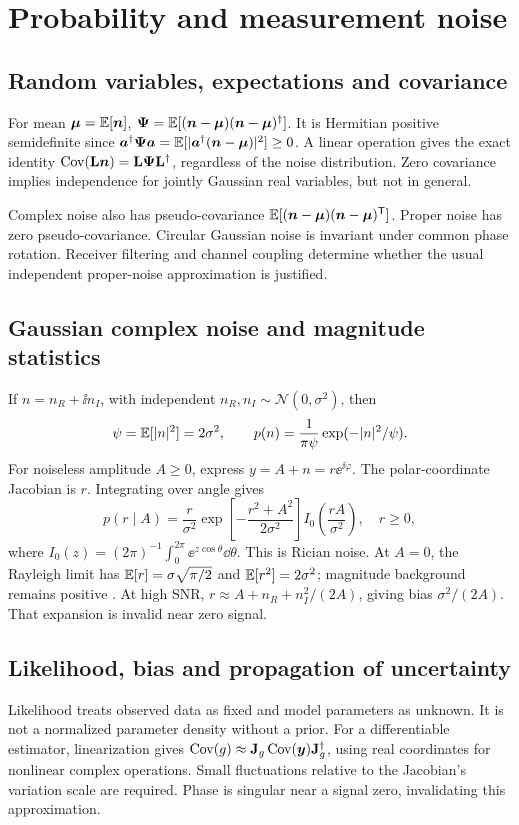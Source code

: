 \section{Probability and measurement noise}
\label{sec:01:probability-and-measurement-noise}
\subsection{Random variables, expectations and covariance}
For mean $\bm{\mu}=\operatorname{\mathbb{E}}[\bm{n}]$,
$\mathbf{\Psi}=\operatorname{\mathbb{E}}[(\bm{n}-\bm{\mu})(\bm{n}-\bm{\mu})^{\dagger}]$.
It is Hermitian positive semidefinite since
$\bm{a}^{\dagger}\mathbf{\Psi}\bm{a}=\operatorname{\mathbb{E}}[\lvert\bm{a}^{\dagger}(\bm{n}-\bm{\mu})\rvert^2]\geq0$.
A linear operation gives the exact identity
$\operatorname{Cov}(\mathbf{L}\bm{n})=\mathbf{L}\mathbf{\Psi}\mathbf{L}^{\dagger}$,
regardless of the noise distribution. Zero covariance implies independence
for jointly Gaussian real variables, but not in general.

Complex noise also has pseudo-covariance
$\operatorname{\mathbb{E}}[(\bm{n}-\bm{\mu})(\bm{n}-\bm{\mu})^{\mathsf T}]$.
Proper noise has zero pseudo-covariance.
Circular Gaussian noise is invariant under common phase rotation.
Receiver filtering and channel coupling determine whether the usual
independent proper-noise approximation is justified.

\subsection{Gaussian complex noise and magnitude statistics}
If $n=n_R+\ii n_I$, with independent
$n_R,n_I\sim\mathcal N(0,\sigma^2)$, then
\[
 \psi=\operatorname{\mathbb{E}}[\lvert n\rvert^2]=2\sigma^2,\qquad
 p(n)=\frac{1}{\pi\psi}\exp(-\lvert n\rvert^2/\psi).
\]
For noiseless amplitude $A\geq0$, express $y=A+n=r\ee^{\ii\varphi}$.
The polar-coordinate Jacobian is $r$. Integrating over angle gives
\begin{equation}
 p(r\mid A)=\frac r{\sigma^2}
   \exp\left[-\frac{r^2+A^2}{2\sigma^2}\right]
   I_0\left(\frac{rA}{\sigma^2}\right),\quad r\geq0,
 \label{eq:01:rice}
\end{equation}
where $I_0(z)=(2\pi)^{-1}\int_0^{2\pi}\ee^{z\cos\theta}\dd\theta$.
This is Rician noise. At $A=0$, the Rayleigh limit has
$\operatorname{\mathbb{E}}[r]=\sigma\sqrt{\pi/2}$ and $\operatorname{\mathbb{E}}[r^2]=2\sigma^2$;
magnitude background remains positive \cite{gudbjartsson1995}.
At high SNR,
$r\approx A+n_R+n_I^2/(2A)$, giving bias $\sigma^2/(2A)$.
That expansion is invalid near zero signal.

\subsection{Likelihood, bias and propagation of uncertainty}
Likelihood treats observed data as fixed and model parameters as unknown.
It is not a normalized parameter density without a prior.
For a differentiable estimator, linearization gives
$\operatorname{Cov}(g)\approx\mathbf{J}_g\operatorname{Cov}(\bm{y})\mathbf{J}_g^{\dagger}$,
using real coordinates for nonlinear complex operations.
Small fluctuations relative to the Jacobian's variation scale are required.
Phase is singular near a signal zero, invalidating this approximation.

